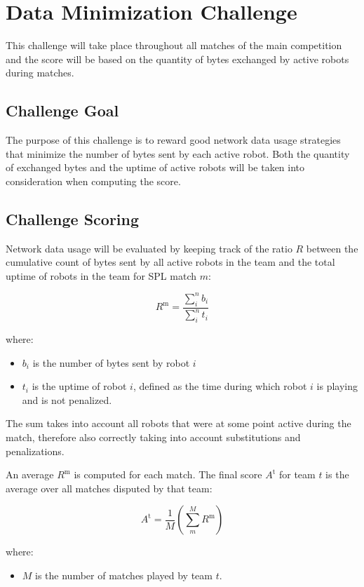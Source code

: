 \section{Data Minimization Challenge} %
This challenge will take place throughout all matches of the main competition and the score will be based on the quantity of bytes exchanged by active robots during matches. 


\subsection{Challenge Goal}
The purpose of this challenge is to reward good network data usage strategies that minimize the number of bytes sent by each active robot. Both the quantity of exchanged bytes and the uptime of active robots will be taken into consideration when computing the score.

\subsection{Challenge Scoring}
Network data usage will be evaluated by keeping track of the ratio $R$ between the cumulative count of bytes sent by all active robots in the team and the total uptime of robots in the team for SPL match $m$:

$$ R^\text{m} = \frac{\sum_{i}^n b_i}{\sum_{i}^n t_i} $$

where:
\begin{itemize}
    \item $b_i$ is the number of bytes sent by robot $i$
    \item $t_i$ is the uptime of robot $i$, defined as the time during which robot $i$ is playing and is not penalized.
\end{itemize}
The sum takes into account all robots that were at some point active during the match, therefore also correctly taking into account substitutions and penalizations.

An average $R^\text{m}$ is computed for each match. The final score $A^\text{t}$ for team $t$ is the average over all matches disputed by that team:

$$ A^\text{t} = \frac{1}{M} \left( \sum_{m}^M R^\text{m} \right) $$

where:
\begin{itemize}
    \item $M$ is the number of matches played by team $t$.
\end{itemize}


